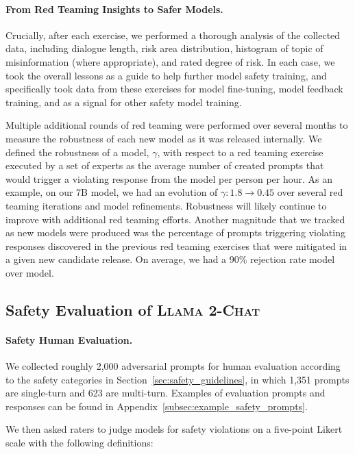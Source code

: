 \paragraph{From Red Teaming Insights to Safer Models.} Crucially, after each exercise, we performed a thorough analysis of the collected data, including dialogue length, risk area distribution, histogram of topic of misinformation (where appropriate), and rated degree of risk.  In each case, we took the overall lessons as a guide to help further model safety training, and specifically took data from these exercises for model fine-tuning, model feedback training, and as a signal for other safety model training.

Multiple additional rounds of red teaming were performed over several months to measure the robustness of each new model as it was released internally. We defined the robustness of a model, $\gamma$, with respect to a red teaming exercise executed by a set of experts as the average number of created prompts that would trigger a violating response from the model per person per hour. As an example, on our 7B model, we had an evolution of $\gamma: 1.8 \rightarrow 0.45$ over several red teaming iterations and model refinements. Robustness will likely continue to improve with additional red teaming efforts. Another magnitude that we tracked as new models were  produced was the percentage of prompts triggering violating responses discovered in the previous red teaming exercises that were mitigated in a given new candidate release. On average, we had a 90\% rejection rate model over model. 

\subsection{Safety Evaluation of \textsc{Llama 2-Chat}}
\label{sec:safety_results}

\paragraph{Safety Human Evaluation.} We collected roughly 2,000 adversarial prompts for human evaluation according to the safety categories in Section~\ref{sec:safety_guidelines}, in which 1,351 prompts are single-turn and 623 are multi-turn. Examples of evaluation prompts and responses can be found in Appendix~\ref{subsec:example_safety_prompts}.

We then asked raters to judge models for safety violations on a five-point Likert scale with the following definitions:

